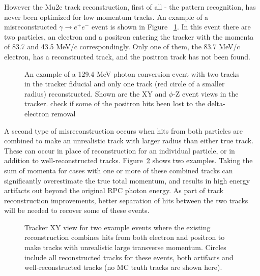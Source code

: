 However the Mu2e track reconstruction, first of all - the pattern recognition, has never
been optimized for low momentum tracks. An example of a misreconstructed $\gamma \to e^+e^-$
event is shown in Figure ~\ref{figure:event_display}. In this event there are two particles,
an electron and a positron entering the tracker with the momenta of 83.7 and 43.5 MeV/c
correspondingly. Only one of them, the 83.7 MeV/c electron, has a reconstructed track, and 
the positron track has not been found.  

\begin{figure}[H]
  \caption{
    \label{figure:sum_mom_vd13}
    An example of a 129.4 MeV photon conversion event with two tracks
    in the tracker fiducial and only one track (red circle of a smaller radius)
    reconstructed. Shown are the XY and $\phi$-Z event views in the tracker.
    {\red check if some of the positron hits been lost to the delta-electron removal}
  }
  \label{figure:event_display}
\end{figure}


A second type of misreconstruction occurs when hits from both particles are combined to make an unrealistic track with larger radius than either true track. These can occur in place of reconstruction for an individual particle, or in addition to well-reconstructed tracks. Figure~\ref{figure:he_artifact_evts} shows two examples. Taking the sum of momenta for cases with one or more of these combined tracks can significantly overestimate the true total momentum, and results in high energy artifacts out beyond the original RPC photon energy. As part of track reconstruction improvements, better separation of hits between the two tracks will be needed to recover some of these events. 

\begin{figure}[H]
  \caption{
    \label{figure:he_artifact_evts}
   Tracker XY view for two example events where the existing reconstruction combines hits from both electron and positron to make tracks with unrealistic large transverse momentum. Circles include all reconstructed tracks for these events, both artifacts and well-reconstructed tracks (no MC truth tracks are shown here). 
  }
  \label{figure:he_artifact_evts}
\end{figure}


